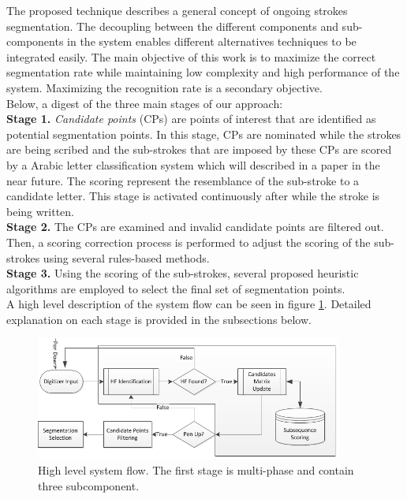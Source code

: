 \documentclass[journal,compsoc]{IEEEtran}
\begin{document}
The proposed technique describes a general concept of ongoing strokes segmentation. The decoupling between the different components and sub-components in the system enables different alternatives techniques to be integrated easily. The main objective of this work is to maximize the correct segmentation rate while maintaining low complexity and high performance of the system. Maximizing the recognition rate is a secondary objective.\\ 

Below, a digest of the three main stages of our approach:\\ 

\textbf{Stage 1.}  \emph{Candidate points} (CPs) are points of interest that are identified as potential segmentation points. In this stage, CPs are nominated while the strokes are being scribed and the sub-strokes that are imposed by these CPs are scored by a Arabic letter classification system which will described in a paper in the near future. The scoring represent the resemblance of the sub-stroke to a candidate letter. This stage is activated continuously after while the stroke is being written.\\

\textbf{Stage 2.} The CPs are examined and invalid candidate points are filtered out. Then, a scoring correction process is performed to adjust the scoring of the sub-strokes using several rules-based methods.\\

\textbf{Stage 3.} Using the scoring of the sub-strokes, several proposed heuristic algorithms are employed to select the final set of segmentation points.\\

A high level description of the system flow can be seen in figure \ref{fig:system_flow}. Detailed explanation on each stage is provided in the subsections below.\\

\begin{figure}
\centering
\includegraphics[width=0.9\textwidth]{./figures/system_flow}
\caption{High level system flow. The first stage is multi-phase and contain three subcomponent. }
\label{fig:system_flow}
\end{figure}
\end{document}
